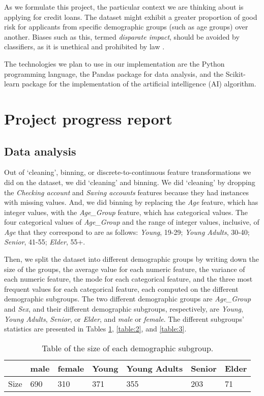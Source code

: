 \documentclass[conference]{IEEEtran}
\begin{document}
As we formulate this project, the particular context we are thinking about is applying for credit loans. The dataset might exhibit a greater proportion of good risk for applicants from specific demographic groups (such as age groups) over another. Biases such as this, termed \emph{disparate impact}, should be avoided by classifiers, as it is unethical and prohibited by law \cite{10.2307/24758720}.  

The technologies we plan to use in our implementation are the Python programming language, the Pandas package for data analysis, and the Scikit-learn package for the implementation of the artificial intelligence (AI) algorithm.

\section{Project progress report}
\subsection{Data analysis}
Out of `cleaning', binning, or discrete-to-continuous feature transformations we did on the dataset, we did `cleaning' and binning. We did `cleaning' by dropping the \emph{Checking account} and \emph{Saving accounts} features because they had instances with missing values. And, we did binning by replacing the \emph{Age} feature, which has integer values, with the \emph{Age\_Group} feature, which has categorical values. The four categorical values of \emph{Age\_Group} and the range of integer values, inclusive, of \emph{Age} that they correspond to are as follows: \textit{Young}, 19-29; \textit{Young Adults}, 30-40; \textit{Senior}, 41-55; \textit{Elder}, 55+.

Then, we split the dataset into different demographic groups by writing down the size of the groups, the average value for each numeric feature, the variance of each numeric feature, the mode for each categorical feature, and the three most frequent values for each categorical feature, each computed on the different demographic subgroups. The two different demographic groups are \emph{Age\_Group} and \emph{Sex}, and their different demographic subgroups, respectively, are \textit{Young}, \textit{Young Adults}, \textit{Senior}, or \textit{Elder}, and \emph{male} or \emph{female}. The different subgroups' statistics are presented in Tables \ref{table:1}, \ref{table:2}, and \ref{table:3}.

\begin{table}[ht]
\begin{center}
\caption{Table of the size of each demographic subgroup.}
\begin{tabularx}{0.49\textwidth} { |X|X|X|X|X|X|X| } 
    \hline
            & male & female & Young & Young Adults & Senior & Elder \\ 
        \hline
        Size & 690  & 310    & 371   & 355          & 203    & 71    \\
        \hline
\end{tabularx}
\label{table:1}
\end{center}
\end{table}
\end{document}
